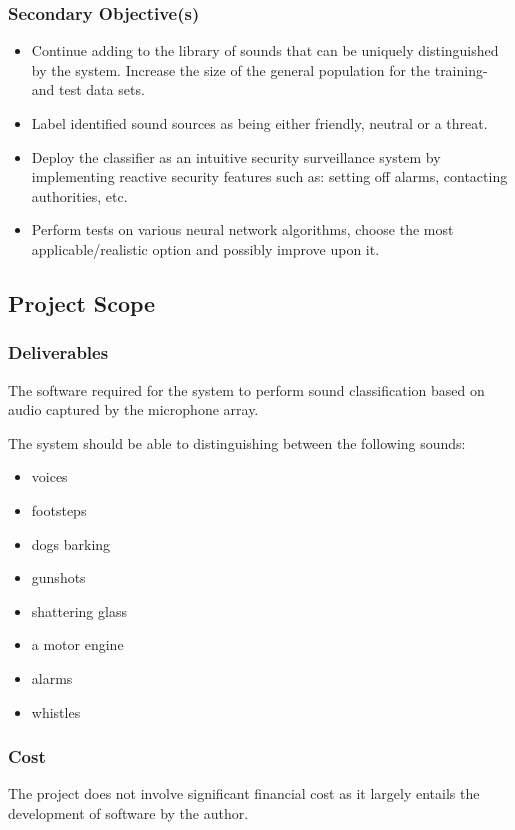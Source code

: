 \documentclass[a4paper,12pt]{article}
\numberwithin{equation}{section}
\numberwithin{figure}{section}
\numberwithin{table}{section}
\begin{document}
\subsubsection{Secondary Objective(s)}
\begin{itemize}
    \item Continue adding to the library of sounds that can be uniquely distinguished by the system. Increase the size of the general population for the training- and test data sets.
    \item Label identified sound sources as being either friendly, neutral or a threat.
    \item Deploy the classifier as an intuitive security surveillance system by implementing reactive security features such as: setting off alarms, contacting authorities, etc.
    \item Perform tests on various neural network algorithms, choose the most applicable/realistic option and possibly improve upon it.
\end{itemize}

\subsection{Project Scope}

\subsubsection{Deliverables}
The software required for the system to perform sound classification based on audio captured by the microphone array.

The system should be able to distinguishing between the following sounds:
\begin{itemize}
    \item voices
    \item footsteps
    \item dogs barking
    \item gunshots
    \item shattering glass
    \item a motor engine
    \item alarms
    \item whistles
\end{itemize}

\subsubsection{Cost} %
The project does not involve significant financial cost as it largely entails the development of software by the author.
\end{document}
